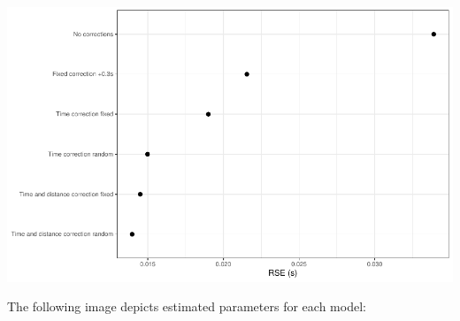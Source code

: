 \documentclass[fleqn,10pt,lineno]{wlpeerj} %
\begin{document}
\begin{center}\includegraphics[width=1\linewidth]{paper_files/figure-latex/unnamed-chunk-63-1} \end{center}

The following image depicts estimated parameters for each model:
\end{document}
